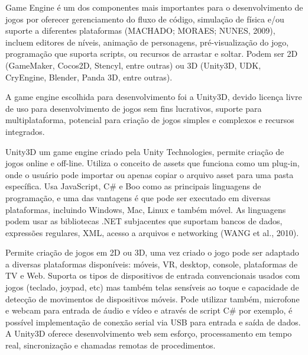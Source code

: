 
Game Engine é um dos componentes mais importantes para o desenvolvimento de jogos por oferecer gerenciamento do fluxo de código, simulação de física e/ou suporte a diferentes plataformas (MACHADO; MORAES; NUNES, 2009), incluem editores de níveis, animação de personagens, pré-visualização do jogo, programação que suporta scripts, ou recursos de arrastar e soltar. Podem ser 2D (GameMaker, Cocos2D, Stencyl, entre outras) ou 3D (Unity3D, UDK, CryEngine, Blender, Panda 3D, entre outras).

A game engine escolhida para desenvolvimento foi a Unity3D, devido licença livre de uso para desenvolvimento de jogos sem fins lucrativos, suporte para multiplataforma, potencial para criação de jogos simples e complexos e recursos integrados.

Unity3D um game engine criado pela Unity Technologies, permite criação de jogos online e off-line. Utiliza o conceito de assets que funciona como um plug-in, onde o usuário pode importar ou apenas copiar o arquivo asset para uma pasta específica. Usa JavaScript, C\# e Boo como as principais linguagens de programação, e uma das vantagens é que pode ser executado em diversas plataformas, incluindo Windows, Mac, Linux e também móvel. As linguagens podem usar as bibliotecas .NET subjacentes que suportam bancos de dados, expressões regulares, XML, acesso a arquivos e networking (WANG et al., 2010).

Permite criação de jogos em 2D ou 3D, uma vez criado o jogo pode ser adaptado a diversas plataformas disponíveis: móveis, VR, desktop, console, plataformas de TV e Web. Suporta os tipos de dispositivos de entrada convencionais usados com jogos (teclado, joypad, etc) mas também telas sensíveis ao toque e capacidade de detecção de movimentos de dispositivos móveis. Pode utilizar também, microfone e webcam para entrada de áudio e vídeo e através de script C\# por exemplo, é possível implementação de conexão serial via USB para entrada e saída de dados. A Unity3D oferece desenvolvimento web sem esforço, processamento em tempo real, sincronização e chamadas remotas de procedimentos.




